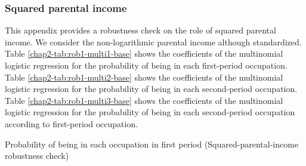 \subsubsection{Squared parental income}

This appendix provides a robustness check on the role of squared parental income. We consider the non-logarithmic parental income although standardized.
Table \ref{chap2-tab:rob1-multi1-base} shows the coefficients of the multinomial logistic regression for the probability of being in each first-period occupation.
Table \ref{chap2-tab:rob1-multi2-base} shows the coefficients of the multinomial logistic regression for the probability of being in each second-period occupation.
Table \ref{chap2-tab:rob1-multi3-base} shows the coefficients of the multinomial logistic regression for the probability of being in each second-period occupation according to first-period occupation.

\begin{table}[!htb]
    \centering
    \caption{Probability of being in each occupation in first period (Squared-parental-income robustness check)}
    \label{chap2-tab:rob1-multi1-base}
\end{table}

